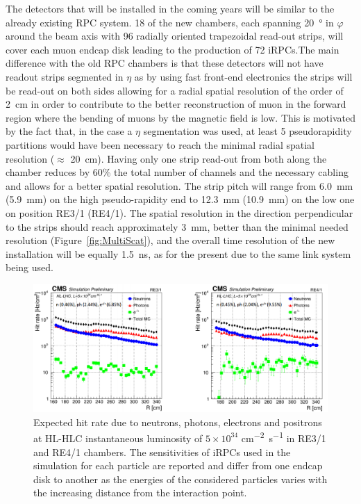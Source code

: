	The detectors that will be installed in the coming years will be similar to the already existing RPC system. 18 of the new chambers, each spanning \SI{20}{\degree} in $\varphi$ around the beam axis with 96 radially oriented trapezoidal read-out strips, will cover each muon endcap disk leading to the production of 72 iRPCs.The main difference with the old RPC chambers is that these detectors will not have readout strips segmented in $\eta$ as by using fast front-end electronics the strips will be read-out on both sides allowing for a radial spatial resolution of the order of \SI{2}{cm} in order to contribute to the better reconstruction of muon in the forward region where the bending of muons by the magnetic field is low. This is motivated by the fact that, in the case a $\eta$ segmentation was used, at least 5 pseudorapidity partitions would have been necessary to reach the minimal radial spatial resolution ($\approx$ \SI{20}{cm}). Having only one strip read-out from both along the chamber reduces by 60\% the total number of channels and the necessary cabling and allows for a better spatial resolution. The strip pitch will range from \SI{6.0}{mm} (\SI{5.9}{mm}) on the high pseudo-rapidity end to \SI{12.3}{mm} (\SI{10.9}{mm}) on the low one on position RE3/1 (RE4/1). The spatial resolution in the direction perpendicular to the strips should reach approximately \SI{3}{mm}, better than the minimal needed resolution (Figure~\ref{fig:MultiScat}), and the overall time resolution of the new installation will be equally \SI{1.5}{ns}, as for the present due to the same link system being used.

	\begin{figure}[H]
		\centering
		\includegraphics[width=\textwidth]{fig/chapt3/RPC-Sim-HL-LHC_Rate.png}
		\caption{\label{fig:iRPC-Rate} Expected hit rate due to neutrons, photons, electrons and positrons at HL-HLC instantaneous luminosity of $5\times10^{34}$ \si{cm^{-2}s^{-1}} in RE3/1 and RE4/1 chambers. The sensitivities of iRPCs used in the simulation for each particle are reported and differ from one endcap disk to another as the energies of the considered particles varies with the increasing distance from the interaction point.}
	\end{figure}
	
